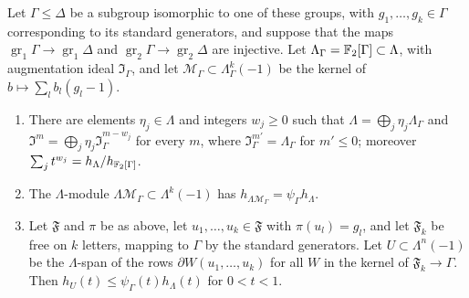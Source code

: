 \begin{lemma}\label{tw:filtered-local-freeness}
Let $\Gamma\le\Delta$ be a subgroup isomorphic to one of these groups, with
$g_1,\dots,g_k\in\Gamma$ corresponding to its standard generators, and
suppose that the maps $\operatorname{gr}_1\Gamma\to\operatorname{gr}_1\Delta$
and $\operatorname{gr}_2\Gamma\to\operatorname{gr}_2\Delta$ are injective. Let $\Lambda_\Gamma=\mathbb F_2[\Gamma]\subset\Lambda$, with
augmentation ideal $\mathfrak I_\Gamma$, and let
$\mathcal M_\Gamma\subset\Lambda_\Gamma^k(-1)$ be the kernel of
$b\mapsto\sum_lb_l(g_l-1)$.
\begin{enumerate}
\item[(a)] There are elements $\eta_j\in\Lambda$ and integers $w_j\ge0$ such
 that $\Lambda=\bigoplus_j\eta_j\Lambda_\Gamma$ and
 $\mathfrak I^m=\bigoplus_j\eta_j\mathfrak I_\Gamma^{m-w_j}$ for every $m$,
 where $\mathfrak I_\Gamma^{m'}=\Lambda_\Gamma$ for $m'\le0$; moreover
 $\sum_jt^{w_j}=h_\Lambda/h_{\mathbb F_2[\Gamma]}$.
\item[(b)] The $\Lambda$-module $\Lambda\mathcal M_\Gamma\subset\Lambda^k(-1)$
 has $h_{\Lambda\mathcal M_\Gamma}=\psi_\Gamma h_\Lambda$.
\item[(c)] Let $\mathfrak F$ and $\pi$ be as above, let
 $u_1,\dots,u_k\in\mathfrak F$ with $\pi(u_l)=g_l$, and let $\mathfrak F_k$ be
 free on $k$ letters, mapping to $\Gamma$ by the standard generators. Let
 $U\subset\Lambda^n(-1)$ be the $\Lambda$-span of the rows
 $\partial W(u_1,\dots,u_k)$ for all $W$ in the kernel of
 $\mathfrak F_k\to\Gamma$. Then $h_U(t)\le\psi_\Gamma(t)h_\Lambda(t)$ for
 $0<t<1$.
\end{enumerate}
\end{lemma}

